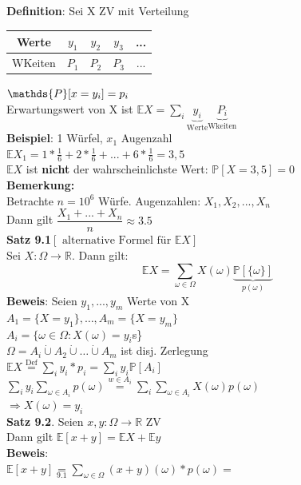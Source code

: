 \textbf{Definition}: Sei X ZV mit Verteilung\medskip\\
\begin{tabular}{c|c|c|c|c}
	Werte&$y_1$&$y_2$&$y_3$&...\\\hline
	WKeiten&$P_1$&$P_2$&$P_3$&...
\end{tabular} \hspace{1cm}$\smallskip\\\mathds{P}[x = y_i] = p_i$\medskip\\
Erwartungswert von X ist $\mathds{E} X = \sum_i \underbrace{y_i}_\text{Werte} \underbrace{P_i}_\text{Wkeiten}$\medskip\\
\textbf{Beispiel}: 1 Würfel, $x_1$ Augenzahl\\
$\mathds{E}X_1 = 1*\frac{1}{6}+2*\frac{1}{6}+...+6*\frac{1}{6} = 3,5$\\
$\mathds{E}X$ ist \textbf{nicht} der wahrscheinlichste Wert: $\mathds{P} [X=3,5] = 0$\smallskip\\
\textbf{Bemerkung:}\\
Betrachte $n=10^6$ Würfe. Augenzahlen: $X_1,X_2,...,X_n$\\
Dann gilt $\dfrac{X_1+...+X_n}{n}\approx 3.5$\medskip\\
\textbf{Satz 9.1}$[\text{ alternative Formel für }\mathds{E}X]$\\
Sei $X:\Omega \rightarrow\mathbb{R}$. Dann gilt: 
$$\mathds{E}X = \sum_{\omega \in \Omega} X(\omega)\underbrace{\mathds{P}[\{\omega\}]}_{p(\omega)}$$
\textbf{Beweis}: Seien $y_1,...,y_m$ Werte von X\medskip\\
$A_1 = \{X = y_1\},\dots ,A_m=\{X=y_m\}$\\
$A_i = \{\omega \in \Omega:X(\omega)=y_i$s\}\smallskip\\
$\Omega = A_i \dot\cup A_2\dot\cup \dots\dot\cup A_m$ ist disj. Zerlegung\\
$\mathds{E}X \overset{\text{Def}}{=} \sum_i y_i*p_i = \sum_i y_i \mathds{P}[A_i]$\\
$\sum_iy_i\sum_{\omega \in A_i} p(\omega) \overset{w \in A_i}{=}\sum_i \sum_{\omega \in A_i} X(\omega)p(\omega)$ \\
$	\Rightarrow X(\omega)=y_i$\medskip\\
\textbf{Satz 9.2}. Seien $x,y :\Omega \rightarrow\mathbb{R}$ ZV\\
Dann gilt $\mathds{E}[x+y] = \mathds{E}X+\mathds{E}y$\medskip\\
\textbf{Beweis}: \\
$\mathds{E}[x+y] \underset{9.1}{=} \sum_{\omega \in \Omega}(x+y)(\omega)*p(\omega)=$\smallskip\\

